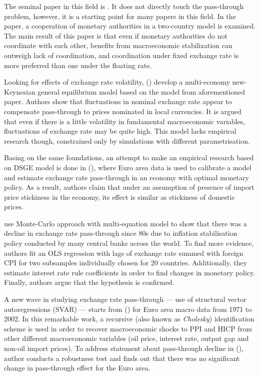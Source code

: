 \documentclass[12pt, a4paper]{extarticle}
\begin{document}
The seminal paper in this field is \cite{Obstfeld2002}. It does not directly touch the pass-through problem, however, it is a starting point for many papers in this field. In the paper, a cooperation of monetary authorities in a two-country model is examined. The main result of this paper is that even if monetary authorities do not coordinate with each other, benefits from macroeconomic stabilization can outweigh lack of coordination, and coordination under fixed exchange rate is more preferred than one under the floating rate.

Looking for effects of exchange rate volatility, (\cite{Devereux2002}) develop a multi-economy new-Keynesian general equilibrium model based on the model from aforementioned paper. Authors show that fluctuations in nominal exchange rate appear to compensate pass-through to prices nominated in local currencies. It is argued that even if there is a little volatility in fundamental macroeconomic variables, fluctuations of exchange rate may be quite high. This model lacks empirical research though, constrained only by simulations with different parametrisation.

Basing on the same foundations, an attempt to make an empirical research based on DSGE model is done in (\cite{Smets2002}), where Euro area data is used to calibrate a model and estimate exchange rate pass-through in an economy with optimal monetary policy. As a result, authors claim that under an assumption of presence of import price stickiness in the economy, its effect is similar as stickiness of domestic prices.

\textcite{Gagnon2004} use Monte-Carlo approach with multi-equation model to show that there was a decline in exchange rate pass-through since 80s due to inflation stabilisation policy conducted by many central banks across the world. To find more evidence, authors fit an OLS regression with lags of exchange rate summed with foreign CPI for two subsamples individually chosen for 20 countries. Additionally, they estimate interest rate rule coefficients in order to find changes in monetary policy. Finally, authors argue that the hypothesis is confirmed.

A new wave in studying exchange rate pass-through --- use of structural vector autoregressions (SVAR) --- starts from (\cite{Hahn2003}) for Euro area macro data from 1971 to 2002. In this remarkable work, a recursive (also known as \textit{Cholesky}) identification scheme is used in order to recover macroeconomic shocks to PPI and HICP from other different macroeconomic variables (oil price, interest rate, output gap and non-oil import prices). To address statement about pass-through decline in (\cite{Gagnon2004}), author conducts a robustness test and finds out that there was no significant change in pass-through effect for the Euro area.
\end{document}
